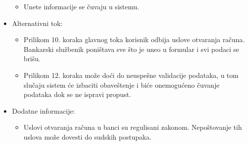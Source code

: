 \documentclass{article}
\begin{document}
\begin{itemize}
\begin{itemize}
            \item Unete informacije se čuvaju u sistemu.
        \end{itemize}    
    \item Alternativni tok:
        \begin{itemize}
            \item Prilikom 10. koraka glavnog toka korisnik odbija uslove otvaranja računa. Bankarski službenik poništava sve što je uneo u formular i svi podaci se brišu.
            \item Prilikom 12. koraka može doći do neuspešne validacije podataka, u tom slučaju sistem će izbaciti obaveštenje i biće onemogućeno čuvanje podataka dok se ne ispravi propust.
        \end{itemize}
    \item Dodatne informacije:
        \begin{itemize}
            \item Uslovi otvaranja računa u banci su regulisani zakonom. Nepoštovanje tih uslova može dovesti do sudskih postupaka.
        \end{itemize}
\end{itemize}
\end{document}
